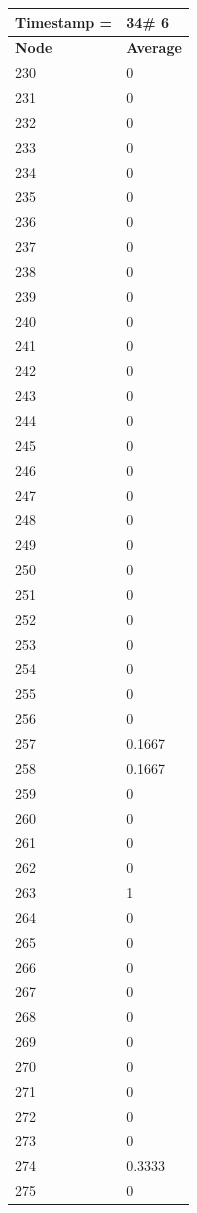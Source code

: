 \begin{tabular}{|l||l|}
\hline
\textbf{Timestamp =} & \textbf{34}\# 6\\\hline
	\textbf{Node} & \textbf{Average} \\ \hline
\hline
	230 & 0 \\ \hline
	231 & 0 \\ \hline
	232 & 0 \\ \hline
	233 & 0 \\ \hline
	234 & 0 \\ \hline
	235 & 0 \\ \hline
	236 & 0 \\ \hline
	237 & 0 \\ \hline
	238 & 0 \\ \hline
	239 & 0 \\ \hline
	240 & 0 \\ \hline
	241 & 0 \\ \hline
	242 & 0 \\ \hline
	243 & 0 \\ \hline
	244 & 0 \\ \hline
	245 & 0 \\ \hline
	246 & 0 \\ \hline
	247 & 0 \\ \hline
	248 & 0 \\ \hline
	249 & 0 \\ \hline
	250 & 0 \\ \hline
	251 & 0 \\ \hline
	252 & 0 \\ \hline
	253 & 0 \\ \hline
	254 & 0 \\ \hline
	255 & 0 \\ \hline
	256 & 0 \\ \hline
	257 & 0.1667 \\ \hline
	258 & 0.1667 \\ \hline
	259 & 0 \\ \hline
	260 & 0 \\ \hline
	261 & 0 \\ \hline
	262 & 0 \\ \hline
	263 & 1 \\ \hline
	264 & 0 \\ \hline
	265 & 0 \\ \hline
	266 & 0 \\ \hline
	267 & 0 \\ \hline
	268 & 0 \\ \hline
	269 & 0 \\ \hline
	270 & 0 \\ \hline
	271 & 0 \\ \hline
	272 & 0 \\ \hline
	273 & 0 \\ \hline
	274 & 0.3333 \\ \hline
	275 & 0 \\ \hline
\end{tabular}

